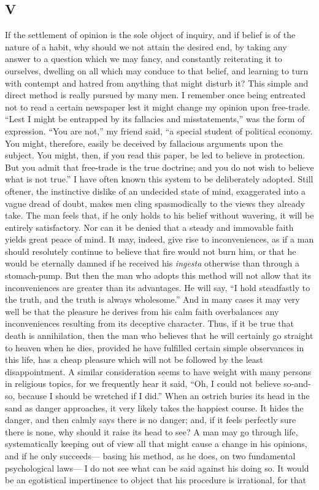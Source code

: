 \subsection*{V}

If the settlement of opinion is the sole object of inquiry, and if belief is of the nature of a habit, why should we not attain the desired end, by taking any answer to a question which we may fancy, and constantly reiterating it to ourselves, dwelling on all which may conduce to that belief, and learning to turn with contempt and hatred from anything that might disturb it? This simple and direct method is really pursued by many men. I remember once being entreated not to read a certain newspaper lest it might change my opinion upon free-trade. ``Lest I might be entrapped by its fallacies and misstatements,'' was the form of expression. ``You are not,'' my friend said, ``a special student of political economy. You might, therefore, easily be deceived by fallacious arguments upon the subject. You might, then, if you read this paper, be led to believe in protection. But you admit that free-trade is the true doctrine; and you do not wish to believe what is not true.'' I have often known this system to be deliberately adopted. Still oftener, the instinctive dislike of an undecided state of mind, exaggerated into a vague dread of doubt, makes men cling spasmodically to the views they already take. The man feels that, if he only holds to his belief without wavering, it will be entirely satisfactory. Nor can it be denied that a steady and immovable faith yields great peace of mind. It may, indeed, give rise to inconveniences, as if a man should resolutely continue to believe that fire would not burn him, or that he would be eternally damned if he received his \emph{ingesta} otherwise than through a stomach-pump. But then the man who adopts this method will not allow that its inconveniences are greater than its advantages. He will say, ``I hold steadfastly to the truth, and the truth is always wholesome.'' And in many cases it may very well be that the pleasure he derives from his calm faith overbalances any inconveniences resulting from its deceptive character. Thus, if it be true that death is annihilation, then the man who believes that he will certainly go straight to heaven when he dies, provided he have fulfilled certain simple observances in this life, has a cheap pleasure which will not be followed by the least disappointment. A similar consideration seems to have weight with many persons in religious topics, for we frequently hear it said, ``Oh, I could not believe so-and-so, because I should be wretched if I did.'' When an ostrich buries its head in the sand as danger approaches, it very likely takes the happiest course. It hides the danger, and then calmly says there is no danger; and, if it feels perfectly sure there is none, why should it raise its head to see? A man may go through life, systematically keeping out of view all that might cause a change in his opinions, and if he only succeeds--- basing his method, as he does, on two fundamental psychological laws--- I do not see what can be said against his doing so. It would be an egotistical impertinence to object that his procedure is irrational, for that 